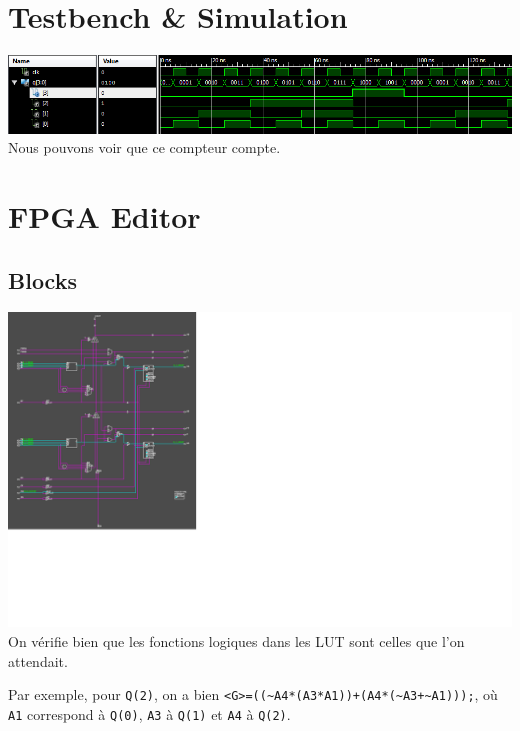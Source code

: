 \documentclass{article}
\begin{document}
\section{Testbench \& Simulation}
\includegraphics[width=\linewidth]{Testbench}
Nous pouvons voir que ce compteur compte.

\section{FPGA Editor}
\subsection{Blocks}
\includegraphics{block1}
On vérifie bien que les fonctions logiques dans les LUT sont celles que l’on attendait.

Par exemple, pour \verb|Q(2)|, on a bien \verb|<G>=((~A4*(A3*A1))+(A4*(~A3+~A1)));|, où
\verb|A1| correspond à \verb|Q(0)|, \verb|A3| à \verb|Q(1)| et \verb|A4| à \verb|Q(2)|.
\end{document}
